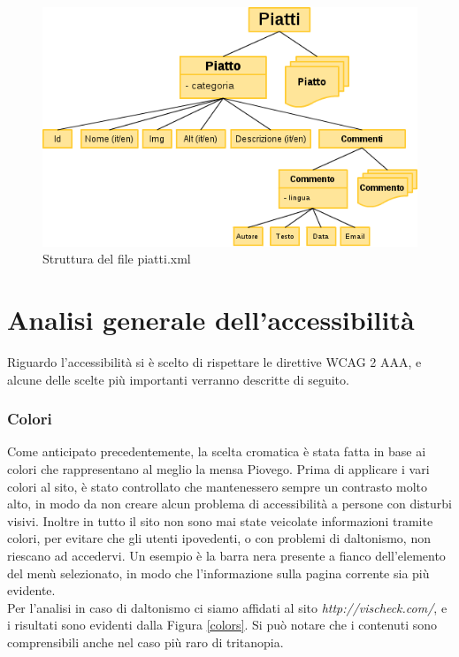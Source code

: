 \documentclass[10pt,a4paper,onecolumn]{article}
\begin{document}
\begin{figure}[h]
\centering
\includegraphics[scale=0.55]{alberoXML}
\caption{Struttura del file piatti.xml}
\label{xml}
\end{figure}

\section{Analisi generale dell'accessibilità}

Riguardo l'accessibilità si è scelto di rispettare le direttive WCAG 2 AAA, e alcune delle scelte più importanti verranno descritte di seguito.

\subsubsection{Colori}

Come anticipato precedentemente, la scelta cromatica è stata fatta in base ai colori che rappresentano al meglio la mensa Piovego. Prima di applicare i vari colori al sito, è stato controllato che mantenessero sempre un contrasto molto alto, in modo da non creare alcun problema di accessibilità a persone con disturbi visivi. Inoltre in tutto il sito non sono mai state veicolate informazioni tramite colori, per evitare che gli utenti ipovedenti, o con problemi di daltonismo, non riescano ad accedervi. Un esempio è la barra nera presente a fianco dell'elemento del menù selezionato, in modo che l'informazione sulla pagina corrente sia più evidente. \\
Per l'analisi in caso di daltonismo ci siamo affidati al sito \textit{http://vischeck.com/}, e i risultati sono evidenti dalla Figura \ref{colors}. Si può notare che i contenuti sono comprensibili anche nel caso più raro di tritanopia. \\
\end{document}
